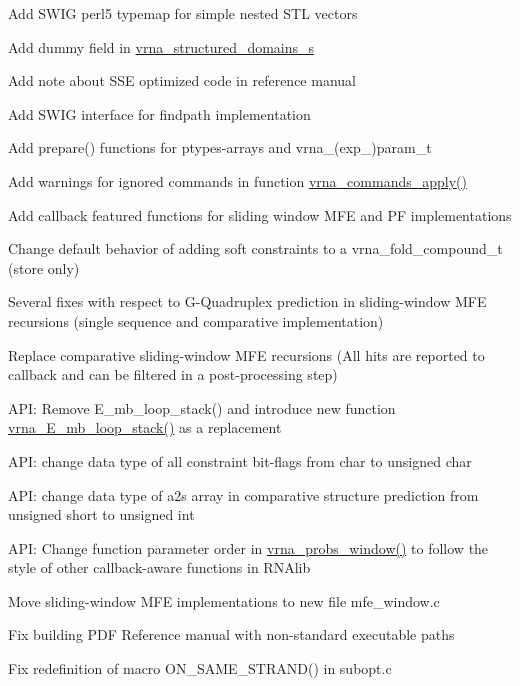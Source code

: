 \begin{DoxyItemize}
\item Add S\+W\+IG perl5 typemap for simple nested S\+TL vectors
\item Add dummy field in \mbox{\hyperlink{structvrna__structured__domains__s}{vrna\+\_\+structured\+\_\+domains\+\_\+s}}
\item Add note about S\+SE optimized code in reference manual
\item Add S\+W\+IG interface for findpath implementation
\item Add prepare() functions for ptypes-\/arrays and vrna\+\_\+(exp\+\_\+)param\+\_\+t
\item Add warnings for ignored commands in function \mbox{\hyperlink{group__command__files_gac65d0fe86f7671a2d2b85dda1a3ddc16}{vrna\+\_\+commands\+\_\+apply()}}
\item Add callback featured functions for sliding window M\+FE and PF implementations
\item Change default behavior of adding soft constraints to a vrna\+\_\+fold\+\_\+compound\+\_\+t (store only)
\item Several fixes with respect to G-\/\+Quadruplex prediction in sliding-\/window M\+FE recursions (single sequence and comparative implementation)
\item Replace comparative sliding-\/window M\+FE recursions (All hits are reported to callback and can be filtered in a post-\/processing step)
\item A\+PI\+: Remove E\+\_\+mb\+\_\+loop\+\_\+stack() and introduce new function \mbox{\hyperlink{group__eval__loops__mb_ga91af6d5fcb0aef243a4071cf9e718020}{vrna\+\_\+\+E\+\_\+mb\+\_\+loop\+\_\+stack()}} as a replacement
\item A\+PI\+: change data type of all constraint bit-\/flags from {\ttfamily char} to {\ttfamily unsigned char}
\item A\+PI\+: change data type of a2s array in comparative structure prediction from {\ttfamily unsigned short} to {\ttfamily unsigned int}
\item A\+PI\+: Change function parameter order in \mbox{\hyperlink{group__part__func__window_ga7115d012988541a65ec323c5f17a334b}{vrna\+\_\+probs\+\_\+window()}} to follow the style of other callback-\/aware functions in R\+N\+Alib
\item Move sliding-\/window M\+FE implementations to new file mfe\+\_\+window.\+c
\item Fix building P\+DF Reference manual with non-\/standard executable paths
\item Fix redefinition of macro O\+N\+\_\+\+S\+A\+M\+E\+\_\+\+S\+T\+R\+A\+N\+D() in subopt.\+c

\end{DoxyItemize}

